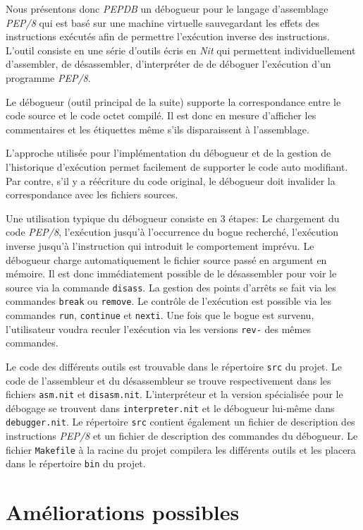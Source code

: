 \documentclass{article}
\begin{document}
Nous présentons donc \emph{PEPDB} un débogueur pour le langage
d'assemblage \emph{PEP/8} qui est basé sur une machine virtuelle
sauvegardant les effets des instructions exécutés afin de permettre
l'exécution inverse des instructions. L'outil consiste en une série
d'outils écris en \emph{Nit} qui permettent individuellement
d'assembler, de désassembler, d'interpréter de de déboguer l'exécution
d'un programme \emph{PEP/8}.

Le débogueur (outil principal de la suite) supporte la correspondance
entre le code source et le code octet compilé. Il est donc en mesure
d'afficher les commentaires et les étiquettes même s'ils disparaissent à
l'assemblage.

L'approche utilisée pour l'implémentation du débogueur et de la gestion
de l'historique d'exécution permet facilement de supporter le code auto
modifiant. Par contre, s'il y a réécriture du code original, le
débogueur doit invalider la correspondance avec les fichiers sources.

Une utilisation typique du débogueur consiste en 3 étapes: Le chargement
du code \emph{PEP/8}, l'exécution jusqu'à l'occurrence du bogue
recherché, l'exécution inverse jusqu'à l'instruction qui introduit le
comportement imprévu. Le débogueur charge automatiquement le fichier
source passé en argument en mémoire. Il est donc immédiatement possible
de le désassembler pour voir le source via la commande \texttt{disass}.
La gestion des points d'arrêts se fait via les commandes \texttt{break}
ou \texttt{remove}. Le contrôle de l'exécution est possible via les
commandes \texttt{run}, \texttt{continue} et \texttt{nexti}. Une fois
que le bogue est survenu, l'utilisateur voudra reculer l'exécution via
les versions \texttt{rev-} des mêmes commandes.

Le code des différents outils est trouvable dans le répertoire
\texttt{src} du projet. Le code de l'assembleur et du désassembleur se
trouve respectivement dans les fichiers \texttt{asm.nit} et
\texttt{disasm.nit}. L'interpréteur et la version spécialisée pour le
débogage se trouvent dans \texttt{interpreter.nit} et le débogueur
lui-même dans \texttt{debugger.nit}. Le répertoire \texttt{src} contient
également un fichier de description des instructions \emph{PEP/8} et un
fichier de description des commandes du débogueur. Le fichier
\texttt{Makefile} à la racine du projet compilera les différents outils
et les placera dans le répertoire \texttt{bin} du projet.

\section{Améliorations possibles}\label{amuxe9liorations-possibles}
\end{document}
